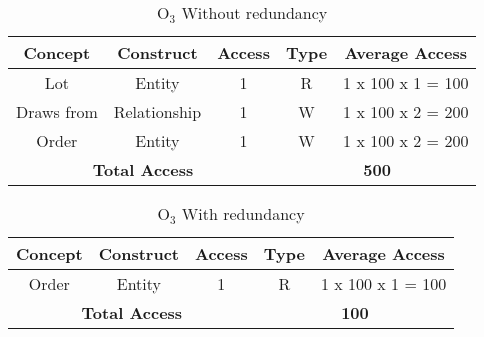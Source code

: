 \begin{table}[!h]\caption{	$ \textrm{O}_\textrm{3} $ Without redundancy }
	\begin{center}
		\begin{tabular}{| c | c | c | c | c |}
			\hline
			\textbf{Concept} & \textbf{Construct} & \textbf{Access} & \textbf{Type} & \textbf{Average Access} \\ \hline
			Lot & Entity & 1 & R & 1 x 100 x 1 = 100 \\ \hline
			Draws from & Relationship & 1 & W & 1 x 100 x 2 = 200 \\ \hline
			Order & Entity & 1 & W & 1 x 100 x 2 = 200 \\ \hline
			\multicolumn{3}{|c|}{\textbf{Total Access}} & \multicolumn{2}{|c|}{\textbf{500}} \\ \hline
		\end{tabular}
	\end{center}
\end{table}


\begin{table}[!h]\caption{	$ \textrm{O}_\textrm{3} $ With redundancy }
	\begin{center}
		\begin{tabular}{| c | c | c | c | c |}
			\hline
			\textbf{Concept} & \textbf{Construct} & \textbf{Access} & \textbf{Type} & \textbf{Average Access} \\ \hline
			Order & Entity & 1 & R & 1 x 100 x 1 = 100 \\ \hline
			\multicolumn{3}{|c|}{\textbf{Total Access}} & \multicolumn{2}{|c|}{\textbf{100}} \\ \hline
		\end{tabular}
	\end{center}
\end{table}












